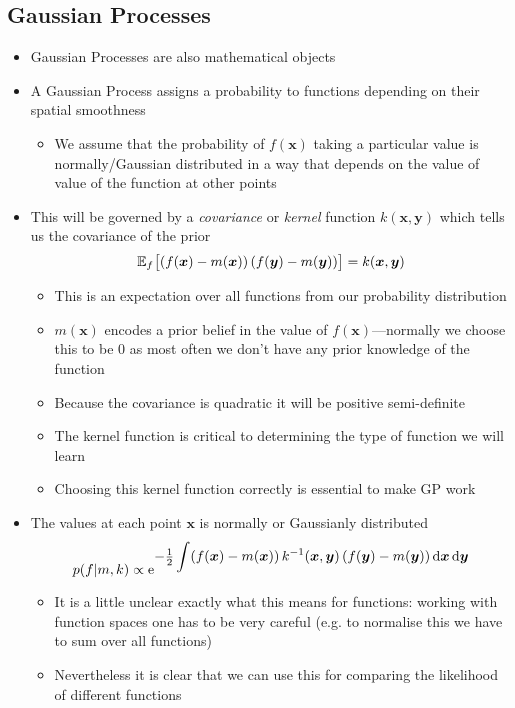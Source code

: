 \documentclass[11pt]{article}
\newcommand{\av}[2][]{\mathbb{E}_{#1\!}\left[ #2 \right]}
\newcommand{\E}[1]{{\rm e}^{\displaystyle #1}}
\newcommand{\dd}{\mathrm{d}}
\begin{document}
\subsection{Gaussian Processes}
\label{sec:org66bce1c}
\begin{itemize}
\item Gaussian Processes are also mathematical objects
\item A Gaussian Process assigns a  probability to functions
depending on their spatial smoothness
\begin{itemize}
\item We assume that the probability of \(f(\bm{x})\) taking a
particular value is normally/Gaussian distributed in a way that
depends on the value of  value of the function at other points
\end{itemize}
\item This will be governed by a \emph{covariance} or \emph{kernel} function
\(k(\bm{x},\bm{y})\)  which tells us the covariance of the prior
$$ \av[f]{ (f(\bm{x})-m(\bm{x})) \, (f(\bm{y})-m(\bm{y}))\strut } =
     k(\bm{x},\bm{y}) $$
\begin{itemize}
\item This is an expectation over all functions from our probability distribution
\item \(m(\bm{x})\) encodes a prior belief in the value of
\(f(\bm{x})\)---normally we choose this to be 0 as most often
we don't have any prior knowledge of the function
\item Because the covariance is quadratic it will be positive semi-definite
\item The kernel function is critical to determining the type of
function we will learn
\item Choosing this kernel function correctly is essential to make GP work
\end{itemize}
\item The values at each point \(\bm{x}\) is normally or Gaussianly
distributed
$$ p(f|m,k) \propto \E{-\tfrac{1}{2} \int (f(\bm{x})-m(\bm{x})) 
      \, k^{-1}(\bm{x},\bm{y}) \, (f(\bm{y}) -m(\bm{y})) \, \dd \bm{x}
      \, \dd \bm{y}} $$
\begin{itemize}
\item It is a little unclear exactly what this means for functions: working
with function spaces one has to be very careful (e.g. to
normalise this we have to sum over all functions)
\item Nevertheless it is clear that we can use this for comparing the
likelihood of different functions

\end{itemize}
\end{itemize}
\end{document}
